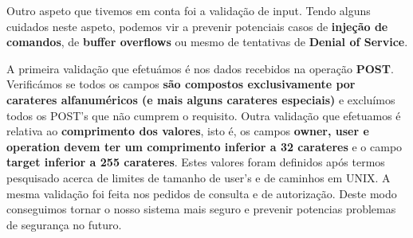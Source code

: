 Outro aspeto que tivemos em conta foi a validação de input. Tendo alguns cuidados neste aspeto, podemos vir a prevenir potenciais casos de \textbf{injeção de comandos}, de \textbf{buffer overflows} ou mesmo de tentativas de \textbf{Denial of Service}.

A primeira validação que efetuámos é nos dados recebidos na operação \textbf{POST}. Verificámos se todos os campos \textbf{são compostos exclusivamente por carateres alfanuméricos (e mais alguns carateres especiais)} e excluímos todos os POST's que não cumprem o requisito. Outra validação que efetuamos é relativa ao \textbf{comprimento dos valores}, isto é, os campos \textbf{owner, user e operation devem ter um comprimento inferior a 32 carateres} e o campo \textbf{target inferior a 255 carateres}. Estes valores foram definidos após termos pesquisado acerca de limites de tamanho de user's e de caminhos em UNIX. A mesma validação foi feita nos pedidos de consulta e de autorização. Deste modo conseguimos tornar o nosso sistema mais seguro e prevenir potencias problemas de segurança no futuro.

\pagebreak